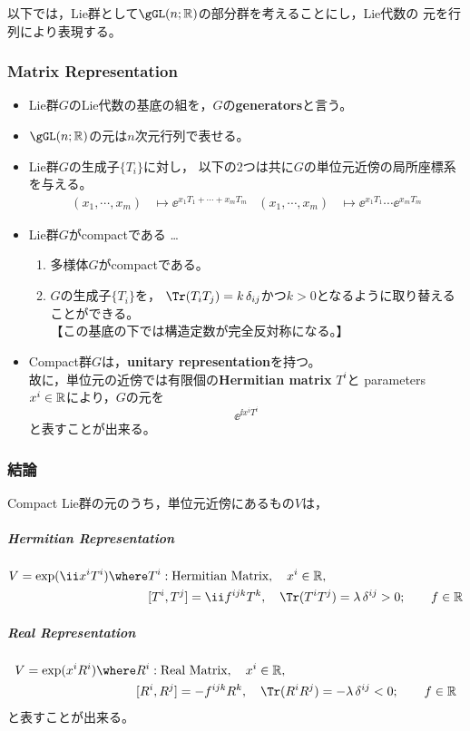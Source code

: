 以下では，Lie群として$\gGL(n;\Real)$の部分群を考えることにし，Lie代数の
元を行列により表現する。

\subsubsection{Matrix Representation}
\begin{itemize}
 \item Lie群$G$のLie代数の基底の組を，$G$の{\bf generators}と言う。
 \item $\gGL(n;\Real)$の元は$n$次元行列で表せる。
 \item Lie群$G$の生成子$\{T_i\}$に対し，
       以下の2つは共に$G$の単位元近傍の局所座標系を与える。
\begin{align}
 (x_1,\cdots,x_m)&\mapsto\ee^{x_1T_1+\cdots+x_mT_m}&
(x_1,\cdots,x_m)&\mapsto\ee^{x_1T_1}\cdots\ee^{x_mT_m}
\end{align}
\end{itemize}

\begin{itemize}
 \item Lie群$G$がcompactである …
\begin{enumerate}
 \item 多様体$G$がcompactである。       
 \item $G$の生成子$\{T_i\}$を，
       $\Tr(T_iT_j)=k\,\delta_{ij}$かつ$k>0$となるように取り替える
       ことができる。\\【この基底の下では構造定数が完全反対称になる。】
\end{enumerate}
 \item Compact群$G$は，{\bf unitary representation}を持つ。\\
       故に，単位元の近傍では有限個の{\bf Hermitian matrix} $T^i$と
       parameters $x^i\in\mathbb R$により，$G$の元を
       \begin{equation}
        \ee^{\ii x^iT^i}
       \end{equation}
       と表すことが出来る。
\end{itemize}
\subsubsection{結論}
Compact Lie群の元のうち，単位元近傍にあるもの$V$は，
\subparagraph{Hermitian Representation}
\begin{align*}
 V=\exp(\ii x^iT^i)
 \where
& T^i:\text{Hermitian Matrix},\quad x^i\in\Real,\\
&[T^i,T^j]=\ii f^{ijk}T^k,\quad \Tr(T^iT^j)=\lambda\,\delta^{ij}>0;\qquad f\in\Real
\end{align*}
\subparagraph{Real Representation}
\begin{align*}
 V=\exp(x^iR^i)
 \where
& R^i:\text{Real Matrix},\quad x^i\in\Real,\\
&[R^i,R^j]=-f^{ijk}R^k,\quad \Tr(R^iR^j)=-\lambda\,\delta^{ij}<0;\qquad f\in\Real
\end{align*}
と表すことが出来る。


